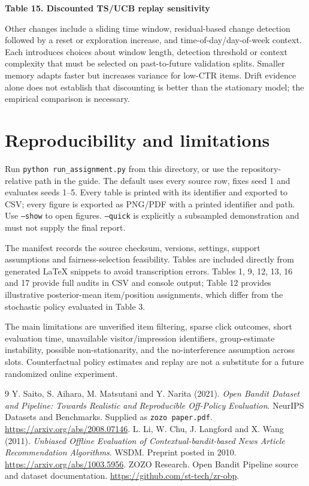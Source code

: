 \documentclass[11pt,a4paper]{article}
\newcommand{\resulttable}[2]{%
  \par\medskip\noindent\begin{minipage}{\linewidth}\centering
  \textbf{Table #1. #2}\par\medskip\small
  \sbox{\resultbox}{}%
  \ifdim\wd\resultbox>\linewidth
    \resizebox{\linewidth}{!}{\usebox{\resultbox}}%
  \else\usebox{\resultbox}\fi
  \end{minipage}\par\medskip}
\begin{document}
\resulttable{15}{Discounted TS/UCB replay sensitivity}
Other changes include a sliding time window, residual-based change detection followed
by a reset or exploration increase, and time-of-day/day-of-week context. Each introduces
choices about window length, detection threshold or context complexity that must be
selected on past-to-future validation splits. Smaller memory adapts faster but increases
variance for low-CTR items. Drift evidence alone does not establish that discounting is
better than the stationary model; the empirical comparison is necessary.

\section{Reproducibility and limitations}
Run \texttt{python run\_assignment.py} from this directory, or use the repository-relative
path in the guide. The default uses every source row, fixes seed 1 and evaluates seeds
1--5. Every table is printed with its identifier and exported to CSV; every figure is
exported as PNG/PDF with a printed identifier and path. Use \texttt{--show} to open figures.
\texttt{--quick} is explicitly a subsampled demonstration and must not supply the final report.

The manifest records the source checksum, versions, settings, support assumptions and
fairness-selection feasibility. Tables are included directly from generated LaTeX snippets
to avoid transcription errors. Tables 1, 9, 12, 13, 16 and 17 provide full audits in CSV
and console output; Table 12 provides illustrative posterior-mean item/position assignments,
which differ from the stochastic policy evaluated in Table 3.

The main limitations are unverified item filtering, sparse click outcomes, short evaluation
time, unavailable visitor/impression identifiers, group-estimate instability, possible
non-stationarity, and the no-interference assumption across slots. Counterfactual policy
estimates and replay are not a substitute for a future randomized online experiment.

\noindent\begin{minipage}{\linewidth}
\begin{thebibliography}{9}
 Y. Saito, S. Aihara, M. Matsutani and Y. Narita (2021).
\emph{Open Bandit Dataset and Pipeline: Towards Realistic and Reproducible Off-Policy Evaluation}.
NeurIPS Datasets and Benchmarks. Supplied as \texttt{zozo paper.pdf}.
\url{https://arxiv.org/abs/2008.07146}.
 L. Li, W. Chu, J. Langford and X. Wang (2011).
\emph{Unbiased Offline Evaluation of Contextual-bandit-based News Article Recommendation Algorithms}.
WSDM. Preprint posted in 2010. \url{https://arxiv.org/abs/1003.5956}.
 ZOZO Research. Open Bandit Pipeline source and dataset documentation.
\url{https://github.com/st-tech/zr-obp}.
\end{thebibliography}
\end{minipage}
\end{document}
